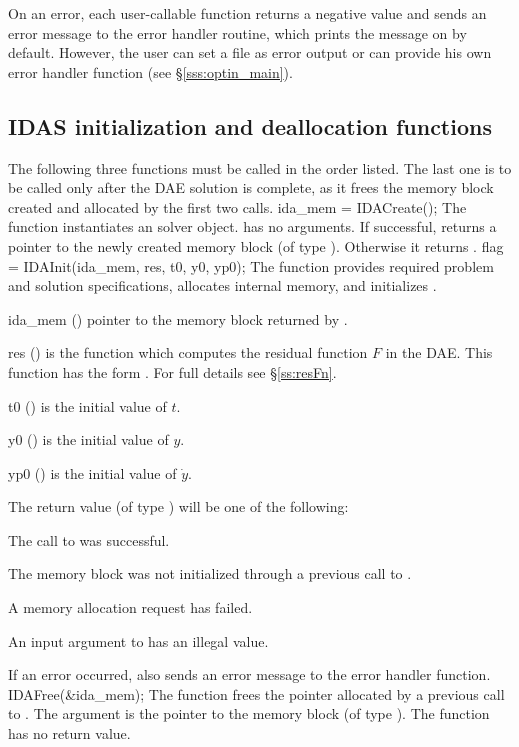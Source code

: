 On an error, each user-callable function returns a negative value and
sends an error message to the error handler routine, which prints the
message on  by default. However, the user can set a file
as error output or can provide his own error handler function (see
\S\ref{sss:optin_main}).

\subsection{IDAS initialization and deallocation functions}
\label{sss:idainit}
The following three functions must be called in the order listed. The last one
is to be called only after the DAE solution is complete, as it frees the {\idas}
memory block created and allocated by the first two calls.
{
  ida\_mem = IDACreate();
}
{
  The function  instantiates an {\idas} solver object.
}
{
   has no arguments.
}
{
  If successful,  returns a pointer to the newly created 
  {\idas} memory block (of type ).  Otherwise it returns .
}
{}
{
  flag = IDAInit(ida\_mem, res, t0, y0, yp0);
}
{
  The function  provides required problem and solution
  specifications, allocates internal memory, and initializes {\idas}.
}
{
  \begin{args}
  \item[ida\_mem] ()
    pointer to the {\idas} memory block returned by .
  \item[res] ()
    is the {\CC} function which computes the residual function $F$ in the DAE.
     This function has the form .
     For full details see \S\ref{ss:resFn}.
  \item[t0] ()
    is the initial value of $t$.
  \item[y0] ()
    is the initial value of $y$. 
  \item[yp0] ()
    is the initial value of $\dot{y}$. 
  \end{args}
}
{
  The return value  (of type ) will be one of the following:
  \begin{args}
  \item[\Id{IDA\_SUCCESS}]
    The call to  was successful.
  \item[\Id{IDA\_MEM\_NULL}] 
    The {\idas} memory block was not initialized through a previous call to
    .
  \item[\Id{IDA\_MEM\_FAIL}] 
    A memory allocation request has failed.
  \item[\Id{IDA\_ILL\_INPUT}] 
    An input argument to  has an illegal value.
  \end{args}
}
{
  If an error occurred,  also sends an error message to the
  error handler function.
}
{
  IDAFree(\&ida\_mem);
}
{
  The function  frees the pointer allocated by
  a previous call to .
}
{
  The argument is the pointer to the {\idas} memory block (of type ).
}
{
  The function  has no return value.
}
{}


